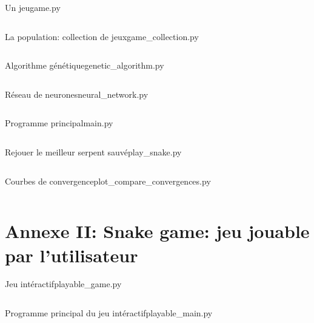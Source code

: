 \documentclass[10pt]{beamer}
\begin{document}
\begin{frame}[t,allowframebreaks]{Un jeu}{game.py}
\scriptsize
\inputminted[mathescape]{python}{../../snake-the-game/game.py}
\end{frame}

\begin{frame}[t,allowframebreaks]{La population: collection de jeux}{game_collection.py}
\scriptsize
\inputminted[mathescape]{python}{../../snake-the-game/game_collection.py}
\end{frame}

\begin{frame}[t,allowframebreaks]{Algorithme génétique}{genetic_algorithm.py}
\scriptsize
\inputminted[mathescape]{python}{../../snake-the-game/genetic_algorithm.py}
\end{frame}

\begin{frame}[t,allowframebreaks]{Réseau de neurones}{neural_network.py}
\scriptsize
\inputminted[mathescape]{python}{../../snake-the-game/neural_network.py}
\end{frame}

\begin{frame}[t,allowframebreaks]{Programme principal}{main.py}
\scriptsize
\inputminted[mathescape]{python}{../../snake-the-game/main.py}
\end{frame}

\begin{frame}[t,allowframebreaks]{Rejouer le meilleur serpent sauvé}{play_snake.py}
\scriptsize
\inputminted[mathescape]{python}{../../snake-the-game/play_snake.py}
\end{frame}

\begin{frame}[t,allowframebreaks]{Courbes de convergence}{plot_compare_convergences.py}
\scriptsize
\inputminted[mathescape]{python}{../../snake-the-game/plot_compare_convergences.py}
\end{frame}

\section{Annexe II: \textbf{Snake game: jeu jouable par l'utilisateur}}

\begin{frame}[t,allowframebreaks]{Jeu intéractif}{playable_game.py}
\scriptsize
\inputminted[mathescape]{python}{../../snake-the-game/playable-snake/playable_game.py}
\end{frame}

\begin{frame}[t,allowframebreaks]{Programme principal du jeu intéractif}{playable_main.py}
\scriptsize
\inputminted[mathescape]{python}{../../snake-the-game/playable-snake/playable_main.py}
\end{frame}
\end{document}
